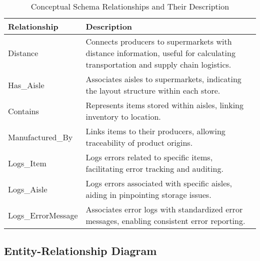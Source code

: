 \documentclass[a4paper,12pt]{article}
\begin{document}
\begin{table}[H]
\centering
\begin{tabularx}{\textwidth}{@{} l >{\RaggedRight\arraybackslash}X @{}}
\toprule
\textbf{Relationship} & \textbf{Description} \\ \midrule
Distance & Connects producers to supermarkets with distance information, useful for calculating transportation and supply chain logistics. \\ 
Has\_Aisle & Associates aisles to supermarkets, indicating the layout structure within each store. \\ 
Contains & Represents items stored within aisles, linking inventory to location. \\ 
Manufactured\_By & Links items to their producers, allowing traceability of product origins. \\ 
Logs\_Item & Logs errors related to specific items, facilitating error tracking and auditing. \\ 
Logs\_Aisle & Logs errors associated with specific aisles, aiding in pinpointing storage issues. \\ 
Logs\_ErrorMessage & Associates error logs with standardized error messages, enabling consistent error reporting. \\ 
\bottomrule
\end{tabularx}
\caption{Conceptual Schema Relationships and Their Description}
\label{tab:relationship-descriptions}
\end{table}

\subsection{Entity-Relationship Diagram}
\newpage
\end{document}
